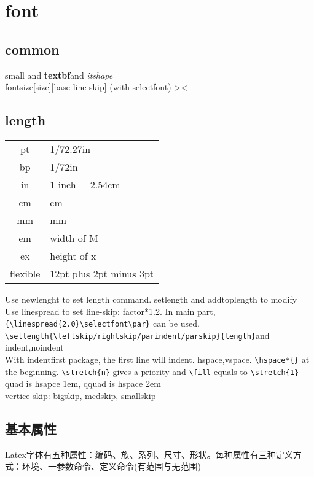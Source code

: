 \documentclass{article}
\begin{document}
\section{font}
\subsection{common}
    {\small small and \textbf{textbf}}{\Large and {\itshape itshape}}\\
    fontsize[size][base line-skip] (with selectfont)
    ><

\subsection{length}
    \begin{table}[H]
        \begin{tabular}{cl}
            \hline
            pt & 1/72.27in\\
            bp & 1/72in   \\
            in & 1 inch = 2.54cm\\
            cm & cm\\
            mm & mm\\ \hline
            em & width of M \\ 
            ex & height of x \\ \hline
            flexible & 12pt plus 2pt minus 3pt\\ \hline
        \end{tabular}
    \end{table}
    Use newlenght to set length command. setlength and addtoplength to modify\\
    Use linespread to set line-skip: factor*1.2. In main part, \verb|{\linespread{2.0}\selectfont\par}| can be used.
    \verb|\setlength{\leftskip/rightskip/parindent/parskip}{length}|and indent,noindent\\
    With indentfirst package, the first line will indent.
    hspace,vspace. \verb|\hspace*{}| at the beginning. \verb|\stretch{n}| gives a priority and \verb|\fill| equals to \hspace*{\fill} \verb|\stretch{1}|\\
    quad is hsapce 1em, qquad is hspace 2em\\
    vertice skip: bigskip, medskip, smallskip

\subsection{基本属性}
	Latex字体有五种属性：编码、族、系列、尺寸、形状。每种属性有三种定义方式：环境、一参数命令、定义命令(有范围与无范围)
\end{document}
